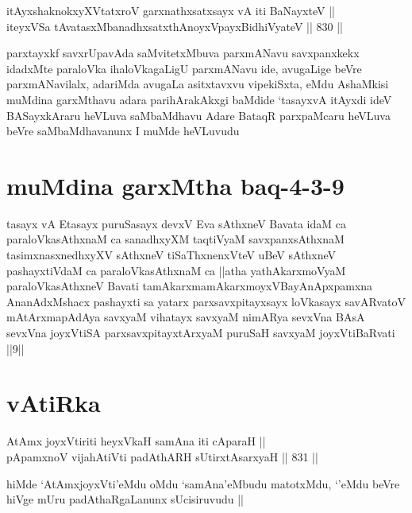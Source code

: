 \begin{shl}
itAyxshaknokxyXVtatxroV garxnathxsatxsayx vA iti BaNayxteV || \\
iteyxVSa tAvatasxMbanadhxsatxthA\s noyxV\s payxBidhiVyateV ||  830 ||  
\end{shl}

\begin{artha}
parxtayxkf savxrUpavAda saMvitetxMbuva parxmANavu savxpanxkekx idadxMte paraloVka ihaloVkagaLigU parxmANavu ide, avugaLige beVre parxmANavilalx, adariMda avugaLa asitxtavxvu vipekiSxta, eMdu AshaMkisi muMdina garxMthavu adara parihArakAkxgi baMdide `tasayxvA itAyxdi ideV BASayxkAraru heVLuva saMbaMdhavu Adare BataqR parxpaMcaru heVLuva beVre saMbaMdhavanunx I muMde heVLuvudu
\end{artha}

\section*{muMdina garxMtha baq-4-3-9}

\begin{shl}
tasayx vA Etasayx puruSasayx devxV Eva sAthxneV Bavata idaM ca paraloVkasAthxnaM ca sanadhxyXM taqtiVyaM savxpanxsAthxnaM tasimxnasxnedhxyXV sAthxneV tiSaThxnenxVteV uBeV sAthxneV pashayxtiVdaM ca paraloVkasAthxnaM ca ||atha yathAkarxmoV\s yaM paraloVkasAthxneV Bavati tamAkarxmamAkarxmoyxVBayAnApxpamxna AnanAdxMshacx pashayxti sa yatarx parxsavxpitayxsayx loVkasayx savARvatoV mAtArxmapAdAya savxyaM vihatayx savxyaM nimARya sevxVna BAsA sevxVna joyxVtiSA parxsavxpitayxtArxyaM puruSaH savxyaM joyxVtiBaRvati ||9||
\end{shl}

\section*{vAtiRka}


\begin{shl}
AtAmx joyxVtiriti heyxVkaH samAna iti cAparaH || \\
pApamxnoV vijahAtiVti padAthARH sUtirxtAsarxyaH ||  831 ||  
\end{shl}

\begin{artha}
hiMde `AtAmxjoyxVti'eMdu oMdu `samAna'eMbudu matotxMdu, `\stext'eMdu beVre hiVge mUru padAthaRgaLanunx sUcisiruvudu ||
\end{artha}

